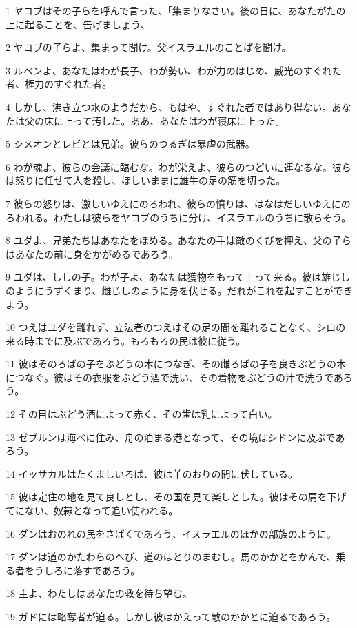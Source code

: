 \par 1 ヤコブはその子らを呼んで言った、「集まりなさい。後の日に、あなたがたの上に起ることを、告げましょう、
\par 2 ヤコブの子らよ、集まって聞け。父イスラエルのことばを聞け。
\par 3 ルベンよ、あなたはわが長子、わが勢い、わが力のはじめ、威光のすぐれた者、権力のすぐれた者。
\par 4 しかし、沸き立つ水のようだから、もはや、すぐれた者ではあり得ない。あなたは父の床に上って汚した。ああ、あなたはわが寝床に上った。
\par 5 シメオンとレビとは兄弟。彼らのつるぎは暴虐の武器。
\par 6 わが魂よ、彼らの会議に臨むな。わが栄えよ、彼らのつどいに連なるな。彼らは怒りに任せて人を殺し、ほしいままに雄牛の足の筋を切った。
\par 7 彼らの怒りは、激しいゆえにのろわれ、彼らの憤りは、はなはだしいゆえにのろわれる。わたしは彼らをヤコブのうちに分け、イスラエルのうちに散らそう。
\par 8 ユダよ、兄弟たちはあなたをほめる。あなたの手は敵のくびを押え、父の子らはあなたの前に身をかがめるであろう。
\par 9 ユダは、ししの子。わが子よ、あなたは獲物をもって上って来る。彼は雄じしのようにうずくまり、雌じしのように身を伏せる。だれがこれを起すことができよう。
\par 10 つえはユダを離れず、立法者のつえはその足の間を離れることなく、シロの来る時までに及ぶであろう。もろもろの民は彼に従う。
\par 11 彼はそのろばの子をぶどうの木につなぎ、その雌ろばの子を良きぶどうの木につなぐ。彼はその衣服をぶどう酒で洗い、その着物をぶどうの汁で洗うであろう。
\par 12 その目はぶどう酒によって赤く、その歯は乳によって白い。
\par 13 ゼブルンは海べに住み、舟の泊まる港となって、その境はシドンに及ぶであろう。
\par 14 イッサカルはたくましいろば、彼は羊のおりの間に伏している。
\par 15 彼は定住の地を見て良しとし、その国を見て楽しとした。彼はその肩を下げてにない、奴隷となって追い使われる。
\par 16 ダンはおのれの民をさばくであろう、イスラエルのほかの部族のように。
\par 17 ダンは道のかたわらのへび、道のほとりのまむし。馬のかかとをかんで、乗る者をうしろに落すであろう。
\par 18 主よ、わたしはあなたの救を待ち望む。
\par 19 ガドには略奪者が迫る。しかし彼はかえって敵のかかとに迫るであろう。
